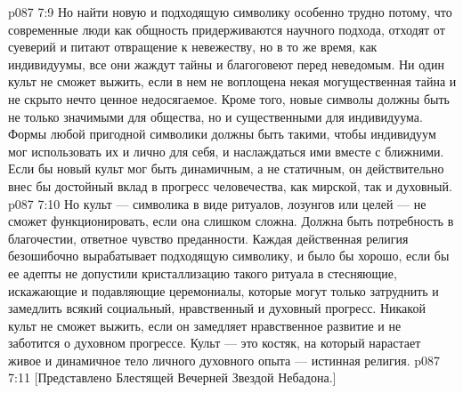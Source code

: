 \vs p087 7:9 Но найти новую и подходящую символику особенно трудно потому, что современные люди как общность придерживаются научного подхода, отходят от суеверий и питают отвращение к невежеству, но в то же время, как индивидуумы, все они жаждут тайны и благоговеют перед неведомым. Ни один культ не сможет выжить, если в нем не воплощена некая могущественная тайна и не скрыто нечто ценное недосягаемое. Кроме того, новые символы должны быть не только значимыми для общества, но и существенными для индивидуума. Формы любой пригодной символики должны быть такими, чтобы индивидуум мог использовать их и лично для себя, и наслаждаться ими вместе с ближними. Если бы новый культ мог быть динамичным, а не статичным, он действительно внес бы достойный вклад в прогресс человечества, как мирской, так и духовный.
\vs p087 7:10 Но культ --- символика в виде ритуалов, лозунгов или целей --- не сможет функционировать, если она слишком сложна. Должна быть потребность в благочестии, ответное чувство преданности. Каждая действенная религия безошибочно вырабатывает подходящую символику, и было бы хорошо, если бы ее адепты не допустили кристаллизацию такого ритуала в стесняющие, искажающие и подавляющие церемониалы, которые могут только затруднить и замедлить всякий социальный, нравственный и духовный прогресс. Никакой культ не сможет выжить, если он замедляет нравственное развитие и не заботится о духовном прогрессе. Культ --- это костяк, на который нарастает живое и динамичное тело личного духовного опыта --- истинная религия.
\vs p087 7:11 [Представлено Блестящей Вечерней Звездой Небадона.]
